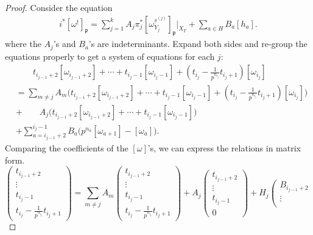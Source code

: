 \documentclass{article}
\begin{document}
\begin{proof}
Consider the equation
\begin{equation}
\begin{aligned}
i^\ast[\omega^{\underline{t}}]_\mathfrak{p}=\sum_{j=1}^k A_j\pi_j^\ast[\omega^{\underline{s}^{(j)}}_{Y_j}]_\mathfrak{p}\Big|_{X_T}+\sum_{a\in H}B_a[h_a].
\end{aligned}
\end{equation}
where the $A_j$'s and $B_a$'s are indeterminants. Expand both sides and re-group the equations properly to get a system of equations for each $j$:
\begin{equation}
\begin{aligned}
&\quad\quad t_{i_{j-1}+2}[\omega_{i_{j-1}+2}]+\cdots + t_{i_j-1}[\omega_{i_j-1}]+(t_{i_j}-\frac{1}{p^{n_{i_j}}}t_{i_j+1})[\omega_{i_j}]\\
&=\sum_{m\ne j}A_m\Big(t_{i_{j-1}+2}[\omega_{i_{j-1}+2}]+\cdots + t_{i_j-1}[\omega_{i_j-1}]+(t_{i_j}-\frac{1}{p^{n_{i_j}}}t_{i_j+1})[\omega_{i_j}]\Big)\\
&+\quad\quad A_j\Big(t_{i_{j-1}+2}[\omega_{i_{j-1}+2}]+\cdots + t_{i_j-1}[\omega_{i_j-1}]\Big)\\
&+\sum_{a=i_{j-1}+2}^{i_j-1}B_a\Big(p^{n_a}[\omega_{a+1}]-[\omega_a]\Big).
\end{aligned}
\end{equation}
Comparing the coefficients of the $[\omega]$'s, we can express the relations in matrix form.
\begin{equation}\label{matrix equation}
\left(\begin{matrix}
t_{i_{j-1}+2}\\
\vdots\\
t_{i_j-1}\\
t_{i_j}-\frac{1}{p^{n_{i_j}}}t_{i_j+1}
\end{matrix}\right)
=\sum_{m\ne j}A_m
\left(\begin{matrix}
t_{i_{j-1}+2}\\
\vdots\\
t_{i_j-1}\\
t_{i_j}-\frac{1}{p^{n_{i_j}}}t_{i_j+1}
\end{matrix}\right)
+A_j
\left(\begin{matrix}
t_{i_{j-1}+2}\\
\vdots\\
t_{i_j-1}\\
0
\end{matrix}\right)
+H_j
\left(\begin{matrix}
B_{i_{j-1}+2}\\
\vdots\\

\end{matrix}
\end{equation}
\end{proof}
\end{document}
